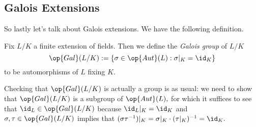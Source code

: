 \subsection{Galois Extensions}
So lastly let's talk about Galois extensions. We have the following definition.
\begin{defi}
	Fix $L/K$ a finite extension of fields. Then we define the \textit{Galois group} of $L/K$
	\[\op{Gal}(L/K):=\{\sigma\in\op{Aut}(L):\sigma|_K=\id_K\}\]
	to be automorphisms of $L$ fixing $K.$
\end{defi}
Checking that $\op{Gal}(L/K)$ is actually a group is as usual: we need to show that $\op{Gal}(L/K)$ is a subgroup of $\op{Aut}(L),$ for which it suffices to see that $\id_L\in\op{Gal}(L/K)$ because $\id_L|_K=\id_K$ and $\sigma,\tau\in\op{Gal}(L/K)$ implies that $(\sigma\tau^{-1})|_K=\sigma|_K\cdot(\tau|_K)^{-1}=\id_K.$

